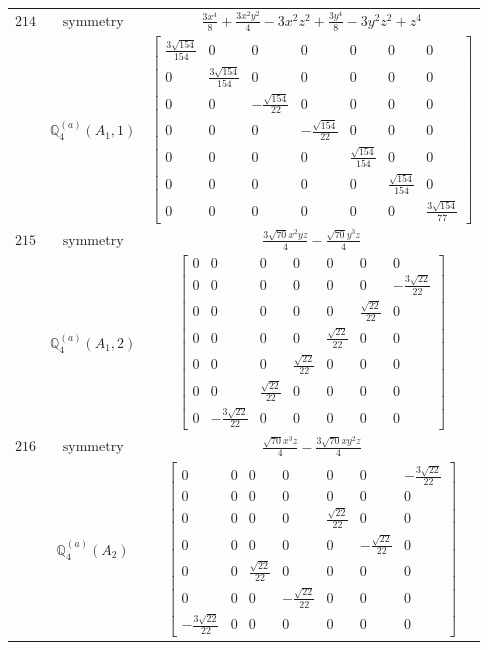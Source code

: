 \documentclass[fleqn,8pt,landscape]{jsarticle}
\begin{document}
\begin{longtable}{ccc}
$ 214 $ & $ \text{symmetry} $ & $ \frac{3 x^{4}}{8} + \frac{3 x^{2} y^{2}}{4} - 3 x^{2} z^{2} + \frac{3 y^{4}}{8} - 3 y^{2} z^{2} + z^{4} $ \\
$  $ & $ \mathbb{Q}_{4}^{(a)}(A_{1},1) $ & $ \begin{bmatrix} \frac{3 \sqrt{154}}{154} & 0 & 0 & 0 & 0 & 0 & 0 \\ 0 & \frac{3 \sqrt{154}}{154} & 0 & 0 & 0 & 0 & 0 \\ 0 & 0 & - \frac{\sqrt{154}}{22} & 0 & 0 & 0 & 0 \\ 0 & 0 & 0 & - \frac{\sqrt{154}}{22} & 0 & 0 & 0 \\ 0 & 0 & 0 & 0 & \frac{\sqrt{154}}{154} & 0 & 0 \\ 0 & 0 & 0 & 0 & 0 & \frac{\sqrt{154}}{154} & 0 \\ 0 & 0 & 0 & 0 & 0 & 0 & \frac{3 \sqrt{154}}{77} \end{bmatrix} $ \\ \hline
$ 215 $ & $ \text{symmetry} $ & $ \frac{3 \sqrt{70} x^{2} y z}{4} - \frac{\sqrt{70} y^{3} z}{4} $ \\
$  $ & $ \mathbb{Q}_{4}^{(a)}(A_{1},2) $ & $ \begin{bmatrix} 0 & 0 & 0 & 0 & 0 & 0 & 0 \\ 0 & 0 & 0 & 0 & 0 & 0 & - \frac{3 \sqrt{22}}{22} \\ 0 & 0 & 0 & 0 & 0 & \frac{\sqrt{22}}{22} & 0 \\ 0 & 0 & 0 & 0 & \frac{\sqrt{22}}{22} & 0 & 0 \\ 0 & 0 & 0 & \frac{\sqrt{22}}{22} & 0 & 0 & 0 \\ 0 & 0 & \frac{\sqrt{22}}{22} & 0 & 0 & 0 & 0 \\ 0 & - \frac{3 \sqrt{22}}{22} & 0 & 0 & 0 & 0 & 0 \end{bmatrix} $ \\ \hline
$ 216 $ & $ \text{symmetry} $ & $ \frac{\sqrt{70} x^{3} z}{4} - \frac{3 \sqrt{70} x y^{2} z}{4} $ \\
$  $ & $ \mathbb{Q}_{4}^{(a)}(A_{2}) $ & $ \begin{bmatrix} 0 & 0 & 0 & 0 & 0 & 0 & - \frac{3 \sqrt{22}}{22} \\ 0 & 0 & 0 & 0 & 0 & 0 & 0 \\ 0 & 0 & 0 & 0 & \frac{\sqrt{22}}{22} & 0 & 0 \\ 0 & 0 & 0 & 0 & 0 & - \frac{\sqrt{22}}{22} & 0 \\ 0 & 0 & \frac{\sqrt{22}}{22} & 0 & 0 & 0 & 0 \\ 0 & 0 & 0 & - \frac{\sqrt{22}}{22} & 0 & 0 & 0 \\ - \frac{3 \sqrt{22}}{22} & 0 & 0 & 0 & 0 & 0 & 0 \end{bmatrix} $ \\ \hline

\end{longtable}
\end{document}
